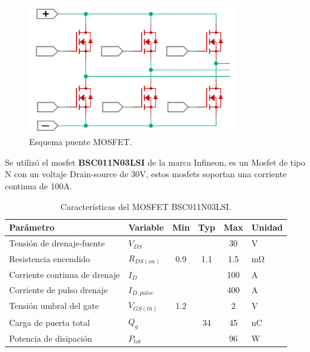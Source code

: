 \documentclass[11pt]{report}
\begin{document}
\begin{figure}[ht]
	\centering
	\includegraphics[width=0.8\textwidth]{imagenes/Diagramas/puente mosfet.png}
	\caption{Esquema puente MOSFET.}
	\label{puente_MOSFET}
\end{figure}
\FloatBarrier

Se utilizó el mosfet \textbf{BSC011N03LSI} de la marca Infineon, es un Mosfet de tipo N con un voltaje Drain-source de 30V, estos mosfets soportan una corriente continua de 100A.

\begin{table}[h!]
	\centering
	\caption{Características del MOSFET BSC011N03LSI.}
	\begin{tabular}{l l c c c l}
		\hline
		\textbf{Parámetro}            & \textbf{Variable} & \textbf{Min} & \textbf{Typ} & \textbf{Max} & \textbf{Unidad}    \\
		\hline
		Tensión de drenaje-fuente     & $V_{DS}$          &              &              & 30           & $\mathrm{V}$       \\
		Resistencia encendido         & $R_{DS(on)}$      & 0.9          & 1.1          & 1.5          & $\mathrm{m\Omega}$ \\
		Corriente continua de drenaje & $I_D$             &              &              & 100          & $\mathrm{A}$       \\
		Corriente de pulso drenaje    & $I_{D,pulse}$     &              &              & 400          & $\mathrm{A}$       \\
		Tensión umbral del gate       & $V_{GS(th)}$      & 1.2          &              & 2            & $\mathrm{V}$       \\
		Carga de puerta total         & $Q_g$             &              & 34           & 45           & $\mathrm{nC}$      \\
		Potencia de disipación        & $P_{tot}$         &              &              & 96           & $\mathrm{W}$       \\
		\hline
	\end{tabular}
\end{table}
\FloatBarrier
\end{document}
